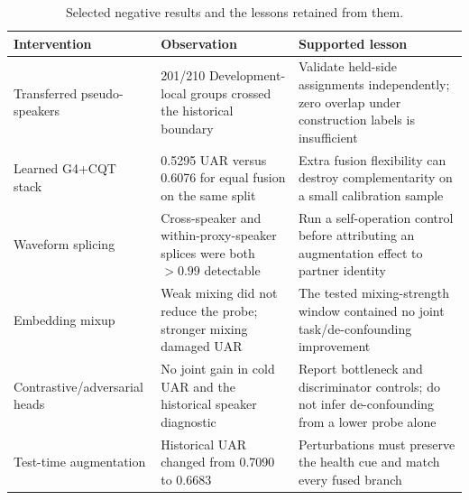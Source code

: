 \begin{table}[t]
\centering
\caption{Selected negative results and the lessons retained from them.}
\label{tab:negative}
\small
\begin{tabular}{p{3.0cm}p{5.4cm}p{5.4cm}}
\toprule
Intervention & Observation & Supported lesson \\
\midrule
Transferred pseudo-speakers & 201/210 Development-local groups crossed the historical boundary & Validate held-side assignments independently; zero overlap under construction labels is insufficient \\
Learned G4+CQT stack & 0.5295 UAR versus 0.6076 for equal fusion on the same split & Extra fusion flexibility can destroy complementarity on a small calibration sample \\
Waveform splicing & Cross-speaker and within-proxy-speaker splices were both $>0.99$ detectable & Run a self-operation control before attributing an augmentation effect to partner identity \\
Embedding mixup & Weak mixing did not reduce the probe; stronger mixing damaged UAR & The tested mixing-strength window contained no joint task/de-confounding improvement \\
Contrastive/adversarial heads & No joint gain in cold UAR and the historical speaker diagnostic & Report bottleneck and discriminator controls; do not infer de-confounding from a lower probe alone \\
Test-time augmentation & Historical UAR changed from 0.7090 to 0.6683 & Perturbations must preserve the health cue and match every fused branch \\
\bottomrule
\end{tabular}
\end{table}
